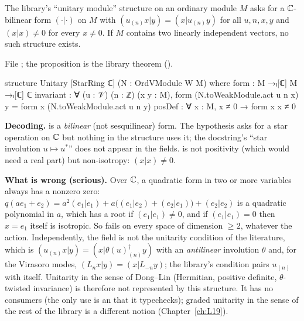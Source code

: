 \begin{proposition}\label{l12:prop:unitary}
The library's ``unitary module'' structure on an ordinary module $M$ asks for a ${\mathbb{C}}$-bilinear form $(\cdot|\cdot)$ on $M$
with $(u_{(n)}x|y) = (x|u_{(n)}y)$ for all $u,n,x,y$ and $(x|x)\neq0$ for every $x\neq0$. If $M$ contains two linearly
independent vectors, no such structure exists.
\end{proposition}
\noindent File ; the proposition is the library theorem
\allowbreak{}\allowbreak{}\allowbreak{} ().
\begin{leancode}
structure Unitary [StarRing ℂ] (N : OrdVModule W M) where
  form : M →ₗ[ℂ] M →ₗ[ℂ] ℂ
  invariant : ∀ (u : 𝒱) (n : ℤ) (x y : M),
    form (N.toWeakModule.act u n x) y = form x (N.toWeakModule.act u n y)
  posDef : ∀ x : M, x ≠ 0 → form x x ≠ 0
\end{leancode}

\begin{dictionary}
\textbf{Decoding.}  is a \emph{bilinear} (not sesquilinear) form. The hypothesis
\lean{[StarRing ℂ]} asks for a star operation on ${\mathbb{C}}$ but nothing in the structure uses it; the docstring's ``star
involution $u\mapsto u^*$'' does not appear in the fields.  is not positivity (which would need a real
part) but non-isotropy: $(x|x)\neq0$.

\textbf{What is wrong (serious).} Over ${\mathbb{C}}$, a quadratic form in two or more variables always has a nonzero zero:
$q(ae_1+e_2) = a^2(e_1|e_1) + a\big((e_1|e_2)+(e_2|e_1)\big) + (e_2|e_2)$ is a quadratic polynomial in $a$, which has a
root if $(e_1|e_1)\neq0$, and if $(e_1|e_1) = 0$ then $x = e_1$ itself is isotropic. So  fails on every
space of dimension $\ge2$, whatever the action. Independently, the  field is not the unitarity
condition of the literature, which is $(u_{(n)}x|y) = (x|\theta(u)^\dagger_{(n)}y)$ with an \emph{antilinear}
involution $\theta$ and, for the Virasoro modes, $(L_nx|y) = (x|L_{-n}y)$; the library's condition pairs $u_{(n)}$
with itself. Unitarity in the sense of Dong--Lin (Hermitian, positive definite, $\theta$-twisted invariance) is
therefore not represented by this structure. It has no consumers (the only use is an  that it
typechecks); graded unitarity in the sense of the rest of the library is a different notion
(Chapter~\ref{ch:L19}).
\end{dictionary}

